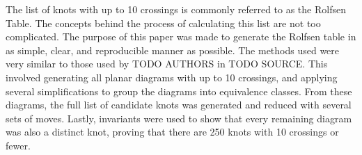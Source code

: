 
\theorems

\begin{paperabstract}
The list of knots with up to 10 crossings is commonly referred to as the Rolfsen
Table.
The concepts behind the process of calculating this list are not too complicated.
The purpose of this paper was made to generate the Rolfsen table in as simple,
clear, and reproducible manner as possible.
The methods used were very similar to those used by TODO AUTHORS in TODO SOURCE.
This involved generating all planar diagrams with up to 10 crossings, and
applying several simplifications to group the diagrams into equivalence classes.
From these diagrams, the full list of candidate knots was generated and reduced
with several sets of moves.
Lastly, invariants were used to show that every remaining diagram was also a
distinct knot, proving that there are 250 knots with 10 crossings or fewer.
\end{paperabstract}
